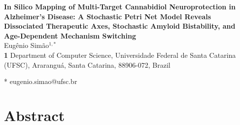 \documentclass[10pt,letterpaper]{article}
\begin{document}
\vspace*{0.2in}

\begin{flushleft}
{\Large
\textbf{In Silico Mapping of Multi-Target Cannabidiol Neuroprotection in Alzheimer's Disease: A Stochastic Petri Net Model Reveals Dissociated Therapeutic Axes, Stochastic Amyloid Bistability, and Age-Dependent Mechanism Switching}
}
\newline
\\
Eug\^enio Sim\~ao$^{1,*}$
\\
\bigskip
\textbf{1} Department of Computer Science, Universidade Federal de Santa Catarina (UFSC), Ararangu\'a, Santa Catarina, 88906-072, Brazil
\\
\bigskip

* eugenio.simao@ufsc.br

\end{flushleft}

\section*{Abstract}
\end{document}
